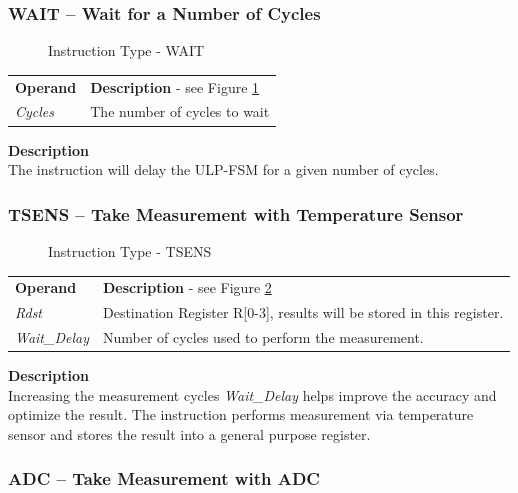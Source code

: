 \documentclass[main\_\_EN.tex]{subfiles}
\begin{document}
\subsubsection{WAIT – Wait for a Number of Cycles}

%
%
%
\begin{figure}[!ht ]
    \centering
    \caption{Instruction Type - WAIT}
    \label{figure:WAIT}
\end{figure}

\begin{tabular}{ l l }
\textbf{Operand} & \textbf{Description} - see Figure \ref{figure:WAIT} \\
\textit{Cycles} & The number of cycles to wait
\end{tabular}

\textbf{ Description } \\
The instruction will delay the ULP-FSM for a given number of cycles.


\newpage

\subsubsection{TSENS – Take Measurement with Temperature Sensor}


%
%
%
%
\begin{figure}[!ht ]
    \centering
    \caption{Instruction Type - TSENS}
    \label{figure:TSENS}
\end{figure}

\begin{tabular}{ l l }
\textbf{Operand} & \textbf{Description} - see Figure \ref{figure:TSENS} \\
\textit{Rdst} & Destination Register R[0-3], results will be stored in this register.\\
\textit{Wait\_Delay} & Number of cycles used to perform the measurement.
\end{tabular}


\textbf{ Description } \\
Increasing the measurement cycles \textit{Wait\_Delay} helps improve the accuracy and optimize the result. The instruction performs measurement via temperature sensor and stores the result into a general purpose register.


\subsubsection{ADC – Take Measurement with ADC} \label{subsection:ADC}
\end{document}
